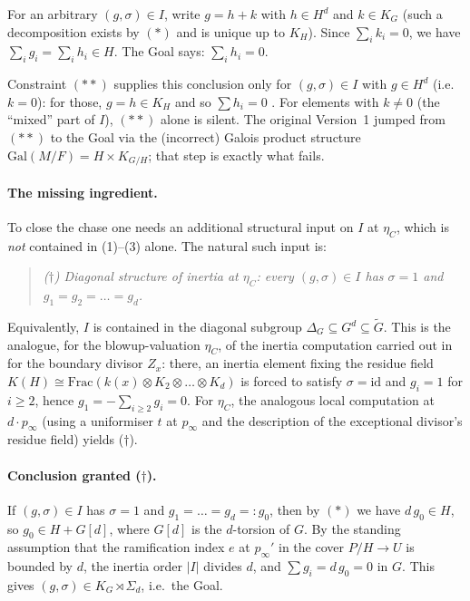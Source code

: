 For an arbitrary $(g,\sigma) \in I$, write $g = h + k$ with $h \in H^d$ and $k \in K_G$ (such a decomposition exists by $(\ast)$ and is unique up to $K_H$). Since $\sum_i k_i = 0$, we have $\sum_i g_i = \sum_i h_i \in H$. The Goal says: $\sum_i h_i = 0$.

Constraint $(\ast\ast)$ supplies this conclusion only for $(g,\sigma) \in I$ with $g \in H^d$ (i.e.\ $k = 0$): for those, $g = h \in K_H$ and so $\sum h_i = 0$ \checkmark. For elements with $k \neq 0$ (the ``mixed'' part of $I$), $(\ast\ast)$ alone is silent. The original Version~1 jumped from $(\ast\ast)$ to the Goal via the (incorrect) Galois product structure $\mathrm{Gal}(M/F) = H \times K_{G/H}$; that step is exactly what fails.

\paragraph{The missing ingredient.} To close the chase one needs an additional structural input on $I$ at $\eta_C$, which is \emph{not} contained in (1)--(3) alone. The natural such input is:

\begin{quote}\itshape
($\dagger$) \emph{Diagonal structure of inertia at $\eta_C$:} every $(g,\sigma) \in I$ has $\sigma = 1$ and $g_1 = g_2 = \dots = g_d$.
\end{quote}

Equivalently, $I$ is contained in the diagonal subgroup $\Delta_G \subseteq G^d \subseteq \tilde G$. This is the analogue, for the blowup-valuation $\eta_C$, of the inertia computation carried out in  for the boundary divisor $Z_x$: there, an inertia element fixing the residue field $K(H) \cong \mathrm{Frac}(k(x) \otimes K_2 \otimes \dots \otimes K_d)$ is forced to satisfy $\sigma=\mathrm{id}$ and $g_i=1$ for $i \geq 2$, hence $g_1 = -\sum_{i\geq 2}g_i = 0$. For $\eta_C$, the analogous local computation at $d \cdot p_\infty$ (using a uniformiser $t$ at $p_\infty$ and the description of the exceptional divisor's residue field) yields ($\dagger$).

\paragraph{Conclusion granted ($\dagger$).} If $(g,\sigma)\in I$ has $\sigma = 1$ and $g_1 = \dots = g_d =: g_0$, then by $(\ast)$ we have $d\,g_0 \in H$, so $g_0 \in H + G[d]$, where $G[d]$ is the $d$-torsion of $G$. By the standing assumption that the ramification index $e$ at $p_\infty'$ in the cover $P/H \to U$ is bounded by $d$, the inertia order $|I|$ divides $d$, and $\sum g_i = d\, g_0 = 0$ in $G$. This gives $(g,\sigma) \in K_G \rtimes \Sigma_d$, i.e.\ the Goal.

